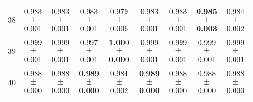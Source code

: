 \begin{table}[!ht]
{\begin{tabular}{r c c c c c c c c}
38 & 0.983 $\pm$ 0.001 & 0.983 $\pm$ 0.001 & 0.983 $\pm$ 0.001 & 0.979 $\pm$ 0.006 & 0.983 $\pm$ 0.001 & 0.983 $\pm$ 0.001 & \textbf{0.985 $\pm$ 0.003} & 0.984 $\pm$ 0.002 \\
39 & 0.999 $\pm$ 0.001 & 0.999 $\pm$ 0.001 & 0.997 $\pm$ 0.001 & \textbf{1.000 $\pm$ 0.000} & 0.999 $\pm$ 0.001 & 0.999 $\pm$ 0.001 & 0.999 $\pm$ 0.001 & 0.999 $\pm$ 0.001 \\
40 & 0.988 $\pm$ 0.000 & 0.988 $\pm$ 0.000 & \textbf{0.989 $\pm$ 0.000} & 0.984 $\pm$ 0.002 & \textbf{0.989 $\pm$ 0.000} & 0.988 $\pm$ 0.000 & 0.988 $\pm$ 0.000 & 0.988 $\pm$ 0.000 \\
\end{tabular}}
\end{table}
